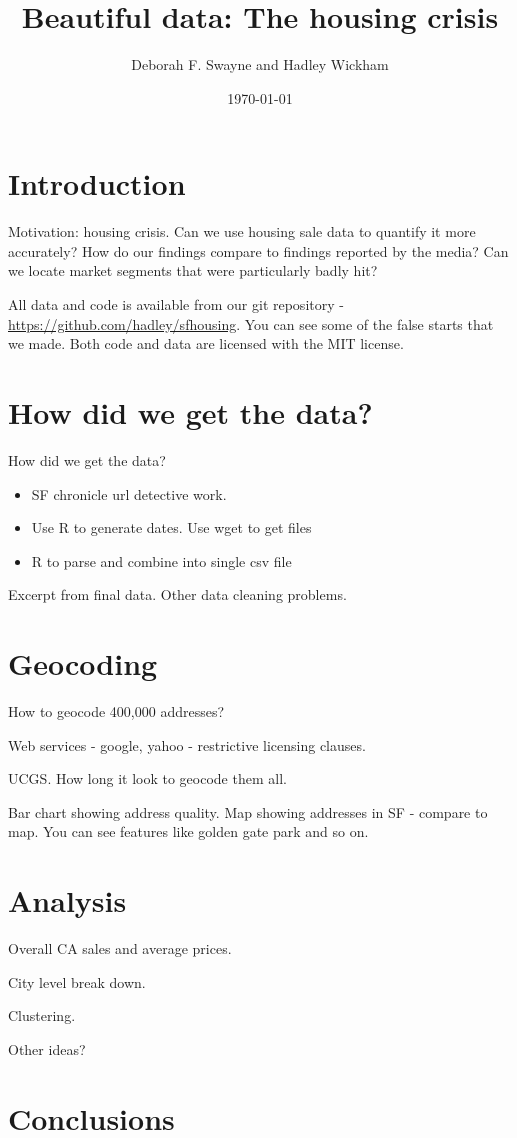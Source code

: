 \documentclass[oneside]{article}
\title{Beautiful data: The housing crisis}
\author{Deborah F. Swayne and Hadley Wickham}
\date{\today}
\begin{document}
\maketitle 

\section{Introduction}

Motivation: housing crisis.  Can we use housing sale data to quantify it more accurately?  How do our findings compare to findings reported by the media?  Can we locate market segments that were particularly badly hit?

All data and code is available from our git repository - \url{https://github.com/hadley/sfhousing}.  You can see some of the false starts that we made.  Both code and data are licensed with the MIT license. 

\section{How did we get the data?}

How did we get the data?

\begin{itemize}
  \item SF chronicle url detective work.
  \item Use R to generate dates.  Use wget to get files
  \item R to parse and combine into single csv file
\end{itemize}

Excerpt from final data.  Other data cleaning problems.

\section{Geocoding} 

How to geocode 400,000 addresses?  

Web services - google, yahoo - restrictive licensing clauses.

UCGS.  How long it look to geocode them all.  

Bar chart showing address quality.  Map showing addresses in SF - compare to map. You can see features like golden gate park and so on.

\section{Analysis}

Overall CA sales and average prices.

City level break down.

Clustering.

Other ideas?

\section{Conclusions}


\end{document}

